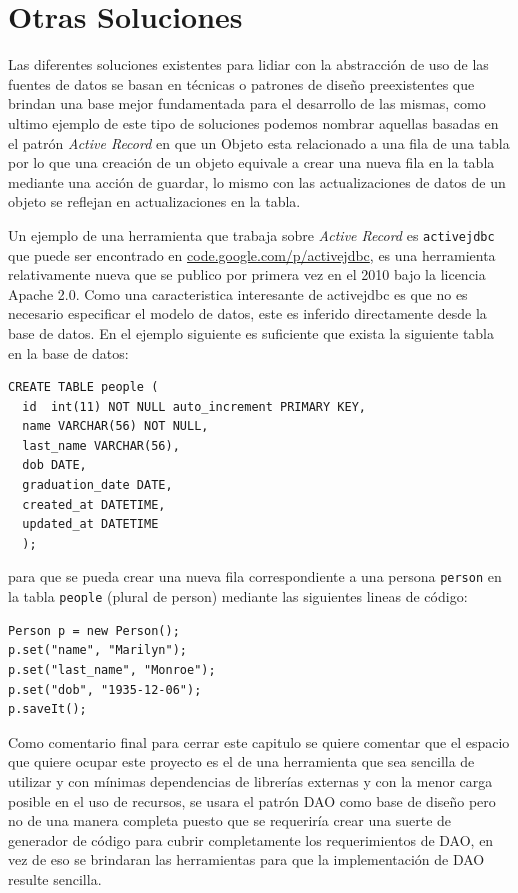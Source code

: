 \section{Otras Soluciones}
Las diferentes soluciones existentes para lidiar con la abstracción de uso de las fuentes de datos se basan en técnicas o patrones de diseño preexistentes que brindan una base mejor fundamentada para el desarrollo de las mismas, como ultimo ejemplo de este tipo de soluciones podemos nombrar aquellas basadas en el patrón \textit{Active Record} en que un Objeto esta relacionado a una fila de una tabla por lo que una creación de un objeto equivale a crear una nueva fila en la tabla mediante una acción de guardar, lo mismo con las actualizaciones de datos de un objeto se reflejan en actualizaciones en la tabla.

Un ejemplo de una herramienta que trabaja sobre \textit{Active Record} es \verb=activejdbc= que puede ser encontrado en \href{http://code.google.com/p/activejdbc/}{code.google.com/p/activejdbc}, es una herramienta relativamente nueva que se publico por primera vez en el 2010 bajo la licencia Apache 2.0. Como  una caracteristica interesante de activejdbc es que no es necesario especificar el modelo de datos, este es inferido directamente desde la base de datos. En el ejemplo siguiente es suficiente que exista la siguiente tabla en la base de datos:
%
\begin{lstlisting}[title=Ejemplo de uso de activejdbc: tabla que debe existir en la BD]
CREATE TABLE people (
  id  int(11) NOT NULL auto_increment PRIMARY KEY, 
  name VARCHAR(56) NOT NULL, 
  last_name VARCHAR(56), 
  dob DATE, 
  graduation_date DATE, 
  created_at DATETIME, 
  updated_at DATETIME
  );
\end{lstlisting}
%
para que se pueda crear una nueva fila correspondiente a una persona \verb=person= en la tabla \verb=people= (plural de person) mediante las siguientes lineas de código: 
\begin{lstlisting}[title=Ejemplo de uso de activejdbc: creando una nueva fila en una tabla]
Person p = new Person();
p.set("name", "Marilyn");
p.set("last_name", "Monroe");
p.set("dob", "1935-12-06");
p.saveIt(); 
\end{lstlisting}
%

Como comentario final para cerrar este capitulo se quiere comentar que el espacio que quiere ocupar este proyecto es el de una herramienta que sea sencilla de utilizar y con mínimas dependencias de librerías externas y con la menor carga posible en el uso de recursos, se usara el patrón DAO como base de diseño pero no de una manera completa puesto que se requeriría crear una suerte de generador de código para cubrir completamente los requerimientos de DAO, en vez de eso se brindaran las herramientas para que la implementación de DAO resulte sencilla.